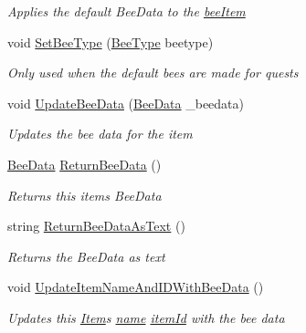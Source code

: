 \begin{DoxyCompactItemize}
\begin{DoxyCompactList}\small\item\em Applies the default Bee\+Data to the \hyperlink{struct_bee_game_1_1_items_1_1_item_a0593f3b7b3ff5daa864f3c6d0ccd77ca}{bee\+Item} \end{DoxyCompactList}\item 
void \hyperlink{struct_bee_game_1_1_items_1_1_item_a80c66aa30f64c498640a4b0ba1ec37b0}{Set\+Bee\+Type} (\hyperlink{namespace_bee_game_1_1_enums_a9376a1582db99d20c756e24de728944f}{Bee\+Type} beetype)
\begin{DoxyCompactList}\small\item\em Only used when the default bees are made for quests \end{DoxyCompactList}\item 
void \hyperlink{struct_bee_game_1_1_items_1_1_item_a4bc320f90a3fb06467046eedeb88ed13}{Update\+Bee\+Data} (\hyperlink{struct_bee_game_1_1_bee_1_1_bee_data}{Bee\+Data} \+\_\+beedata)
\begin{DoxyCompactList}\small\item\em Updates the bee data for the item \end{DoxyCompactList}\item 
\hyperlink{struct_bee_game_1_1_bee_1_1_bee_data}{Bee\+Data} \hyperlink{struct_bee_game_1_1_items_1_1_item_a3751a7c44aa4ff5975f1487ade757d9f}{Return\+Bee\+Data} ()
\begin{DoxyCompactList}\small\item\em Returns this items Bee\+Data \end{DoxyCompactList}\item 
string \hyperlink{struct_bee_game_1_1_items_1_1_item_a1c2f63541269f310381704fc7cc5bc5d}{Return\+Bee\+Data\+As\+Text} ()
\begin{DoxyCompactList}\small\item\em Returns the Bee\+Data as text \end{DoxyCompactList}\item 
void \hyperlink{struct_bee_game_1_1_items_1_1_item_a6ceebb94663dc0cb54e048ec37fab3fa}{Update\+Item\+Name\+And\+I\+D\+With\+Bee\+Data} ()
\begin{DoxyCompactList}\small\item\em Updates this \hyperlink{struct_bee_game_1_1_items_1_1_item}{Item}\textquotesingle{}s \hyperlink{struct_bee_game_1_1_items_1_1_item_a0b0bd7eb510757f650f1be3d05b23fc8}{name} \hyperlink{struct_bee_game_1_1_items_1_1_item_aa85bfeab893271c26f8ca41b638ada1c}{item\+Id} with the bee data \end{DoxyCompactList}\item 

\end{DoxyCompactItemize}
